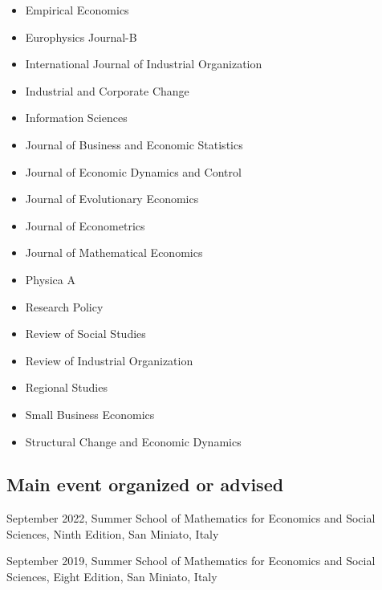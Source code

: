 \documentclass[a4paper]{article}
\begin{document}
\begin{itemize}
\item Empirical Economics

\item Europhysics Journal-B

\item International Journal of Industrial Organization

\item Industrial and Corporate Change

\item Information Sciences

\item Journal of Business and Economic Statistics

\item Journal of Economic Dynamics and Control

\item Journal of Evolutionary Economics

\item Journal of Econometrics

\item Journal of Mathematical Economics

\item Physica A

\item Research Policy

\item Review of Social Studies

\item Review of Industrial Organization

\item Regional Studies

\item Small Business Economics

\item Structural Change and Economic Dynamics
\end{itemize}


\subsection{Main event organized or advised%
  \label{main-event-organized-or-advised}%
}

September 2022, Summer School of Mathematics for Economics and Social
Sciences, Ninth Edition, San Miniato, Italy

September 2019, Summer School of Mathematics for Economics and Social
Sciences, Eight Edition, San Miniato, Italy
\end{document}
